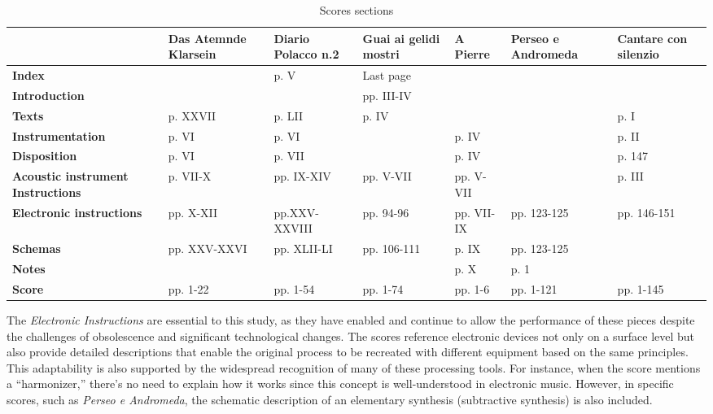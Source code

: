 \begin{longtable}{|p{}|p{}|p{}|p{}|p{}|p{}|p{}|}
    \caption{Scores sections} \label{tab:c-scores-sections} \\
    \hline
    \scriptsize\textbf{} & \scriptsize\textbf{Das Atemnde Klarsein} & \scriptsize\textbf{Diario Polacco n.2} & \scriptsize\textbf{Guai ai gelidi mostri} & \scriptsize\textbf{A Pierre} & \scriptsize\textbf{Perseo e Andromeda} & \scriptsize\textbf{Cantare con silenzio} \\
    \hline
    \scriptsize\textbf{Index} &  & \scriptsize p. V & \scriptsize Last page &  &  & \\\hline
    \scriptsize\textbf{Introduction} & & & \scriptsize pp. III-IV & & & \\\hline
    \scriptsize\textbf{Texts} & \scriptsize p. XXVII & \scriptsize p. LII & \scriptsize p. IV & & & \scriptsize p. I \\\hline
    \scriptsize\textbf{Instrumentation} & \scriptsize p. VI & \scriptsize p. VI &  & \scriptsize p. IV & &  \scriptsize p. II \\\hline
    \scriptsize\textbf{Disposition} & \scriptsize p. VI & \scriptsize p. VII & & \scriptsize p. IV & & \scriptsize p. 147 \\\hline
    \scriptsize\textbf{Acoustic instrument Instructions} & \scriptsize p. VII-X & \scriptsize pp. IX-XIV & \scriptsize pp. V-VII & \scriptsize pp. V-VII & & \scriptsize p. III \\\hline
    \scriptsize\textbf{Electronic instructions}	& \scriptsize pp. X-XII & \scriptsize pp.XXV-XXVIII	& \scriptsize pp. 94-96 & \scriptsize pp. VII-IX& \scriptsize pp. 123-125 & \scriptsize pp. 146-151 \\\hline
    \scriptsize\textbf{Schemas}	& \scriptsize pp. XXV-XXVI & \scriptsize pp. XLII-LI & \scriptsize pp. 106-111 & \scriptsize	p. IX & \scriptsize pp. 123-125 & \\\hline
    \scriptsize\textbf{Notes} & & & & \scriptsize p. X & \scriptsize p. 1 & \\\hline
    \scriptsize\textbf{Score} & \scriptsize pp. 1-22 & \scriptsize pp. 1-54 & \scriptsize pp. 1-74 & \scriptsize pp. 1-6 & \scriptsize pp. 1-121 & \scriptsize pp. 1-145 \\\hline
\end{longtable}
The \textit{Electronic Instructions} are essential to this study, as they have enabled and continue to allow the performance of these pieces despite the challenges of obsolescence and significant technological changes. The scores reference electronic devices not only on a surface level but also provide detailed descriptions that enable the original process to be recreated with different equipment based on the same principles. This adaptability is also supported by the widespread recognition of many of these processing tools. For instance, when the score mentions a ``harmonizer,'' there’s no need to explain how it works since this concept is well-understood in electronic music. However, in specific scores, such as \textit{Perseo e Andromeda}, the schematic description of an elementary synthesis (subtractive synthesis) is also included.\\
